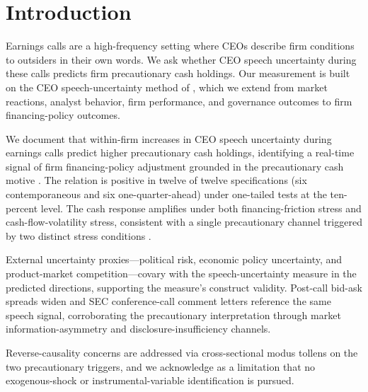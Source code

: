 
\section{Introduction}
\label{sec:intro}

Earnings calls are a high-frequency setting where CEOs describe firm conditions to outsiders in their own words. We ask whether CEO speech uncertainty during these calls predicts firm precautionary cash holdings. Our measurement is built on the CEO speech-uncertainty method of , which we extend from market reactions, analyst behavior, firm performance, and governance outcomes to firm financing-policy outcomes.

We document that within-firm increases in CEO speech uncertainty during earnings calls predict higher precautionary cash holdings, identifying a real-time signal of firm financing-policy adjustment grounded in the precautionary cash motive \cite{opler1999,bates2009}. The relation is positive in twelve of twelve specifications (six contemporaneous and six one-quarter-ahead) under one-tailed tests at the ten-percent level. The cash response amplifies under both financing-friction stress and cash-flow-volatility stress, consistent with a single precautionary channel triggered by two distinct stress conditions \cite{almeida2004,hanqiu2007}.

External uncertainty proxies---political risk, economic policy uncertainty, and product-market competition---covary with the speech-uncertainty measure in the predicted directions, supporting the measure's construct validity. Post-call bid-ask spreads widen and SEC conference-call comment letters reference the same speech signal, corroborating the precautionary interpretation through market information-asymmetry and disclosure-insufficiency channels.

Reverse-causality concerns are addressed via cross-sectional modus tollens on the two precautionary triggers, and we acknowledge as a limitation that no exogenous-shock or instrumental-variable identification is pursued.

